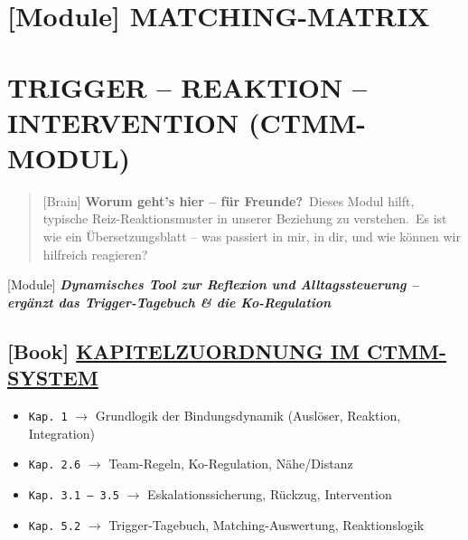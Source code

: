 \hypertarget{matching-matrix}{%
\section{\texorpdfstring{[Module] \textbf{MATCHING-MATRIX}}{[Module] MATCHING-MATRIX}}\label{matching-matrix}}

\hypertarget{trigger-reaktion-intervention-ctmm-modul}{%
\section{\texorpdfstring{\textbf{TRIGGER -- REAKTION -- INTERVENTION (CTMM-MODUL)}}{TRIGGER -- REAKTION -- INTERVENTION (CTMM-MODUL)}}\label{trigger-reaktion-intervention-ctmm-modul}}

\begin{quote}
[Brain] \textbf{Worum geht's hier -- für Freunde?}\
Dieses Modul hilft, typische Reiz-Reaktionsmuster in unserer Beziehung zu verstehen.\
Es ist wie ein Übersetzungsblatt -- was passiert in mir, in dir, und wie können wir hilfreich reagieren?
\end{quote}

[Module] \emph{\textbf{Dynamisches Tool zur Reflexion und Alltagssteuerung -- ergänzt das Trigger-Tagebuch \& die Ko-Regulation}}

\hypertarget{section}{%
\subsection{}\label{section}}

\hypertarget{kapitelzuordnung-im-ctmm-system}{%
\subsection{\texorpdfstring{[Book] \textbf{\ul{KAPITELZUORDNUNG IM CTMM-SYSTEM}}}{[Book] KAPITELZUORDNUNG IM CTMM-SYSTEM}}\label{kapitelzuordnung-im-ctmm-system}}

\begin{itemize}
\tightlist
\item
  \texttt{Kap.\ }\texttt{1} $\rightarrow$ Grundlogik der Bindungsdynamik (Auslöser, Reaktion, Integration)
\item
  \texttt{Kap.\ }\texttt{2.6} $\rightarrow$ Team-Regeln, Ko-Regulation, Nähe/Distanz
\item
  \texttt{Kap.\ }\texttt{3.1\ --\ 3.5} $\rightarrow$ Eskalationssicherung, Rückzug, Intervention
\item
  \texttt{Kap.\ }\texttt{5.2} $\rightarrow$ Trigger-Tagebuch, Matching-Auswertung, Reaktionslogik
\end{itemize}

